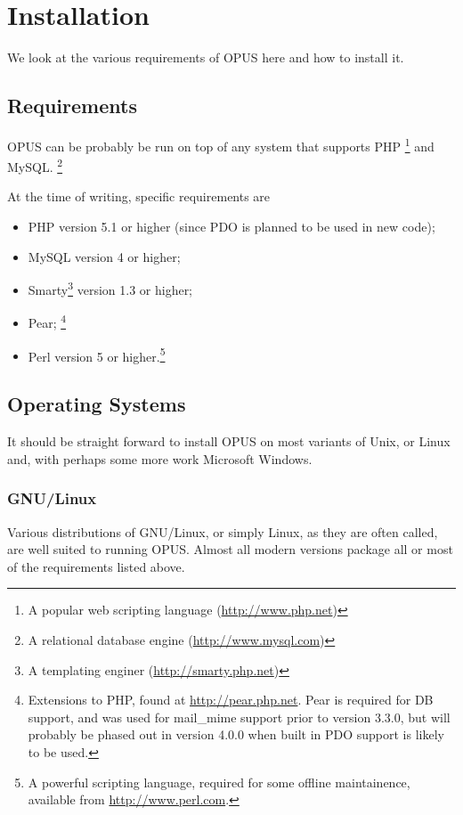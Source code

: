 \documentclass[12 pt]{book}
\begin{document}
\chapter{Installation}

We look at the various requirements of OPUS here and how to install it.

\section{Requirements}

OPUS can be probably be run on top of  any system that supports PHP%
\footnote{A popular web scripting language (\url{http://www.php.net})} and MySQL.%
\footnote{A relational database engine (\url{http://www.mysql.com})}

At the time of writing, specific requirements are
\begin{itemize}
  \item PHP version 5.1 or higher (since PDO is planned to be used in new code);
  \item MySQL version 4 or higher;
  \item Smarty\footnote{A templating enginer (\url{http://smarty.php.net})} version 1.3 or higher;
  \item Pear;%
    \footnote{Extensions to PHP, found at \url{http://pear.php.net}. Pear is required for DB support, and was used for mail\_mime support prior to version 3.3.0,
     but will probably be phased out in version 4.0.0 when built in PDO support is likely to be used.}
  \item Perl version 5 or higher.\footnote{A powerful scripting language, required for some offline maintainence, available from \url{http://www.perl.com}.}
\end{itemize}

\section{Operating Systems}

It should be straight forward to install OPUS on most variants of Unix, or Linux and, with perhaps some more work Microsoft Windows.

\subsection{GNU/Linux}

Various distributions of GNU/Linux, or simply Linux, as they are often called, are well suited to running OPUS. Almost all modern versions
package all or most of the requirements listed above.
\end{document}
